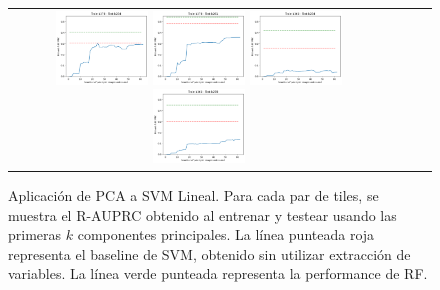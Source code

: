 \begin{figure}[h!]
\begin{tabular}{cccc}
\includegraphics[width=0.25\textwidth]{Kap5/linear_INDIVIDUAL_CURVES_train=b278test=b234.png}  \includegraphics[width=0.25\textwidth]{Kap5/linear_INDIVIDUAL_CURVES_train=b278test=b261.png} 
 \includegraphics[width=0.25\textwidth]{Kap5/linear_INDIVIDUAL_CURVES_train=b360test=b234.png}  \includegraphics[width=0.25\textwidth]{Kap5/linear_INDIVIDUAL_CURVES_train=b360test=b278.png} 
\end{tabular}
\caption{Aplicación de PCA a SVM Lineal. Para cada par de tiles, se muestra el R-AUPRC obtenido al entrenar y testear usando las primeras $k$ componentes principales. La línea punteada roja representa el baseline de SVM, obtenido sin utilizar extracción de variables. La línea verde punteada representa la performance de RF.}
\label{fig:pca_l}
\end{figure}

